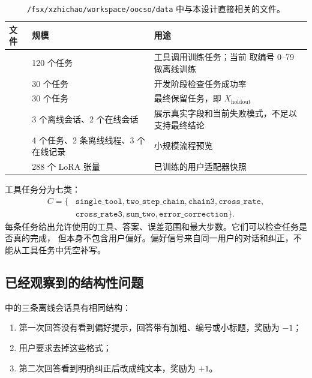 \documentclass[11pt,UTF8,fontset=fandol]{ctexart}
\newcommand{\Xholdout}{X_{\mathrm{holdout}}}
\begin{document}
\begin{table}[H]
  \centering
  \caption{\texttt{/fsx/xzhichao/workspace/oocso/data} 中与本设计直接相关的文件。}
  \begin{tabularx}{\textwidth}{@{}L{0.29\textwidth}L{0.18\textwidth}Y@{}}
    \toprule
    文件 & 规模 & 用途 \\
    \midrule
     &
    120 个任务 &
    工具调用训练任务；当前  取编号 0--79 做离线训练 \\
     &
    30 个任务 &
    开发阶段检查任务成功率 \\
     &
    30 个任务 &
    最终保留任务，即 \(\Xholdout\) \\
     &
    3 个离线会话、2 个在线会话 &
    展示真实字段和当前失败模式，不足以支持最终结论 \\
     &
    4 个任务、2 条离线线程、3 个在线记录 &
    小规模流程预览 \\
     &
    288 个 LoRA 张量 &
    已训练的用户适配器快照 \\
    \bottomrule
  \end{tabularx}
\end{table}

工具任务分为七类：
\[
  \begin{aligned}
  C=\{&
  \texttt{single\_tool},\texttt{two\_step\_chain},
  \texttt{chain3},\texttt{cross\_rate},\\
  &\texttt{cross\_rate3},\texttt{sum\_two},
  \texttt{error\_correction}\}.
  \end{aligned}
\]
每条任务给出允许使用的工具、答案、误差范围和最大步数。它们可以检查任务是否真的完成，
但本身不包含用户偏好。偏好信号来自同一用户的对话和纠正，不能从工具任务中凭空补写。

\subsection{已经观察到的结构性问题}

 中的三条离线会话具有相同结构：
\begin{enumerate}
  \item 第一次回答没有看到偏好提示，回答带有加粗、编号或小标题，奖励为 \(-1\)；
  \item 用户要求去掉这些格式；
  \item 第二次回答看到明确纠正后改成纯文本，奖励为 \(+1\)。
\end{enumerate}
\end{document}
